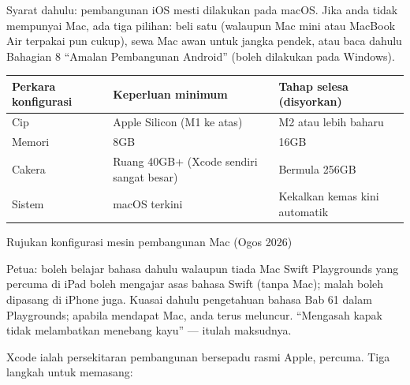 


Syarat dahulu: pembangunan iOS mesti dilakukan pada macOS. Jika anda tidak mempunyai Mac, ada tiga pilihan: beli satu (walaupun Mac mini atau MacBook Air terpakai pun cukup), sewa Mac awan untuk jangka pendek, atau baca dahulu Bahagian 8 “Amalan Pembangunan Android” (boleh dilakukan pada Windows).

\begin{center}
\begin{tabularx}{\linewidth}{|X|X|X|}
\hline
\textbf{Perkara konfigurasi} & \textbf{Keperluan minimum} & \textbf{Tahap selesa (disyorkan)} \tabularnewline
\hline
Cip & Apple Silicon (M1 ke atas) & M2 atau lebih baharu \tabularnewline
Memori & 8GB & 16GB \tabularnewline
Cakera & Ruang 40GB+ (Xcode sendiri sangat besar) & Bermula 256GB \tabularnewline
Sistem & macOS terkini & Kekalkan kemas kini automatik \tabularnewline
\hline
\end{tabularx}
\end{center}

\begin{center}\small\color{gray}Rujukan konfigurasi mesin pembangunan Mac (Ogos 2026)\end{center}

\begin{tcbinfo}{Petua: boleh belajar bahasa dahulu walaupun tiada Mac}
Swift Playgrounds yang percuma di iPad boleh mengajar asas bahasa Swift (tanpa Mac); malah boleh dipasang di iPhone juga. Kuasai dahulu pengetahuan bahasa Bab 61 dalam Playgrounds; apabila mendapat Mac, anda terus meluncur. “Mengasah kapak tidak melambatkan menebang kayu” — itulah maksudnya.

\end{tcbinfo}


Xcode ialah persekitaran pembangunan bersepadu rasmi Apple, percuma. Tiga langkah untuk memasang:

